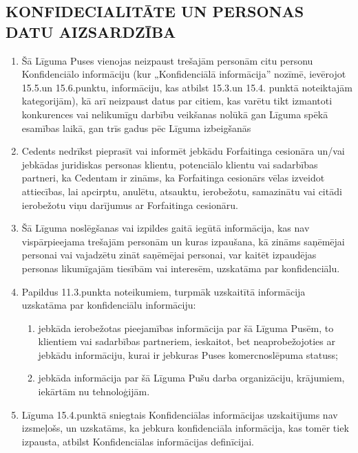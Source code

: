 \documentclass[a4paper]{article}
\begin{document}
\begin{multicols}{2}
  \subsection{KONFIDECIALITĀTE UN PERSONAS DATU AIZSARDZĪBA}

  \begin{enumerate}
  \item{Šā Līguma Puses vienojas neizpaust trešajām personām citu personu
Konfidenciālo informāciju (kur „Konfidenciālā informācija” nozīmē,
ievērojot 15.5.un 15.6.punktu, informāciju, kas atbilst 15.3.un 15.4.
punktā noteiktajām kategorijām), kā arī neizpaust datus par citiem,
kas varētu tikt izmantoti konkurences vai nelikumīgu darbību
veikšanas nolūkā gan Līguma spēkā esamības laikā, gan trīs gadus pēc
Līguma izbeigšanās}

  \item{Cedents nedrīkst pieprasīt vai informēt jebkādu Forfaitinga cesionāra
un/vai jebkādas juridiskas personas klientu, potenciālo klientu vai
sadarbības partneri, ka Cedentam ir zināms, ka Forfaitinga cesionārs
vēlas izveidot attiecības, lai apcirptu, anulētu, atsauktu, ierobežotu,
samazinātu vai citādi ierobežotu viņu darījumus ar Forfaitinga
cesionāru.}

  \item{Šā Līguma noslēgšanas vai izpildes gaitā iegūtā informācija, kas nav
vispārpieejama trešajām personām un kuras izpaušana, kā zināms
saņēmējai personai vai vajadzētu zināt saņēmējai personai, var kaitēt
izpaudējas personas likumīgajām tiesībām vai interesēm, uzskatāma
par konfidenciālu.}

  \item{Papildus 11.3.punkta noteikumiem, turpmāk uzskaitītā informācija
uzskatāma par konfidenciālu informāciju:}

    \begin{enumerate}
    \item{jebkāda ierobežotas pieejamības informācija par šā Līguma
Pusēm, to klientiem vai sadarbības partneriem, ieskaitot, bet
neaprobežojoties ar jebkādu informāciju, kurai ir jebkuras Puses
komercnoslēpuma statuss;}

    \item{jebkāda informācija par šā Līguma Pušu darba organizāciju,
krājumiem, iekārtām nu tehnoloģijām.}
    \end{enumerate}

  \item{Līguma 15.4.punktā sniegtais Konfidenciālas informācijas
uzskaitījums nav izsmeļošs, un uzskatāms, ka jebkura konfidenciāla
informācija, kas tomēr tiek izpausta, atbilst Konfidenciālas
informācijas definīcijai.}


\end{enumerate}
\end{multicols}
\end{document}

